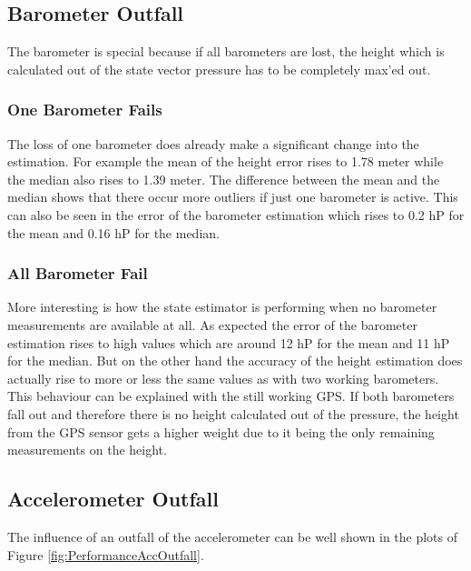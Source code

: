 \subsection{Barometer Outfall}
The barometer is special because if all barometers are lost,
the height which is calculated out of the state vector pressure has to be completely max'ed out.

\subsubsection{One Barometer Fails}
The loss of one barometer does already make a significant change into the estimation.
For example the mean of the height error rises to 1.78 meter while the median also rises to 1.39 meter.
The difference between the mean and the median shows that there occur more outliers if just one barometer is active.
This can also be seen in the error of the barometer estimation which rises to 0.2 hP for the mean and 0.16 hP for the median.

\subsubsection{All Barometer Fail}
More interesting is how the state estimator is performing when no barometer measurements are available at all.
As expected the error of the barometer estimation rises to high values which are around 12 hP for the mean and 11 hP for the median.
But on the other hand the accuracy of the height estimation does actually rise to more or less the same values as with two working barometers.
This behaviour can be explained with the still working GPS.
If both barometers fall out and therefore there is no height calculated out of the pressure, the height from the
GPS sensor gets a higher weight due to it being the only remaining measurements on the height.
\newpage
\subsection{Accelerometer Outfall}
The influence of an outfall of the accelerometer can be well shown in the plots of Figure \ref{fig:PerformanceAccOutfall}.

